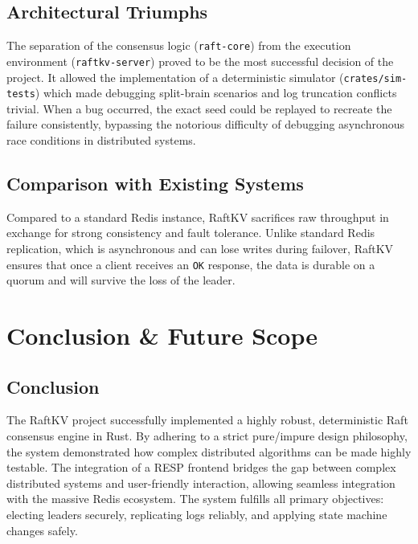 \documentclass[12pt,a4paper]{report}
\begin{document}
\section{Architectural Triumphs}
The separation of the consensus logic (\texttt{raft-core}) from the execution environment (\texttt{raftkv-server}) proved to be the most successful decision of the project. It allowed the implementation of a deterministic simulator (\texttt{crates/sim-tests}) which made debugging split-brain scenarios and log truncation conflicts trivial. When a bug occurred, the exact seed could be replayed to recreate the failure consistently, bypassing the notorious difficulty of debugging asynchronous race conditions in distributed systems.

\section{Comparison with Existing Systems}
Compared to a standard Redis instance, RaftKV sacrifices raw throughput in exchange for strong consistency and fault tolerance. Unlike standard Redis replication, which is asynchronous and can lose writes during failover, RaftKV ensures that once a client receives an \texttt{OK} response, the data is durable on a quorum and will survive the loss of the leader.

\chapter{Conclusion \& Future Scope}

\section{Conclusion}
The RaftKV project successfully implemented a highly robust, deterministic Raft consensus engine in Rust. By adhering to a strict pure/impure design philosophy, the system demonstrated how complex distributed algorithms can be made highly testable. The integration of a RESP frontend bridges the gap between complex distributed systems and user-friendly interaction, allowing seamless integration with the massive Redis ecosystem. The system fulfills all primary objectives: electing leaders securely, replicating logs reliably, and applying state machine changes safely.
\end{document}
